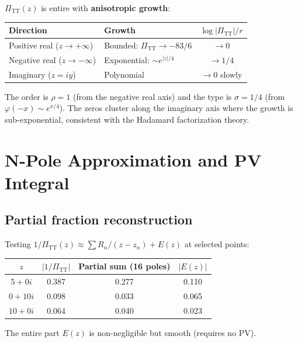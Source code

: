 \documentclass[11pt,a4paper]{article}
\newcommand{\PiTT}{\Pi_{\mathrm{TT}}}
\begin{document}
$\PiTT(z)$ is entire with \textbf{anisotropic growth}:

\begin{center}
\begin{tabular}{llc}
\toprule
Direction & Growth & $\log|\PiTT|/r$ \\
\midrule
Positive real ($z \to +\infty$) & Bounded: $\PiTT \to -83/6$ & $\to 0$ \\
Negative real ($z \to -\infty$) & Exponential: $\sim e^{|z|/4}$ &
  $\to 1/4$ \\
Imaginary ($z = iy$) & Polynomial & $\to 0$ slowly \\
\bottomrule
\end{tabular}
\end{center}

\noindent
The order is $\rho = 1$ (from the negative real axis) and the type
is $\sigma = 1/4$ (from $\varphi(-x) \sim e^{x/4}$).  The zeros
cluster along the imaginary axis where the growth is sub-exponential,
consistent with the Hadamard factorization theory.


\section{N-Pole Approximation and PV Integral}
\label{sec:npole}

\subsection{Partial fraction reconstruction}

Testing $1/\PiTT(z) \approx \sum R_n/(z - z_n) + E(z)$ at selected
points:

\begin{center}
\begin{tabular}{cccc}
\toprule
$z$ & $|1/\PiTT|$ & Partial sum (16 poles) & $|E(z)|$ \\
\midrule
$5 + 0i$ & 0.387 & 0.277 & 0.110 \\
$0 + 10i$ & 0.098 & 0.033 & 0.065 \\
$10 + 0i$ & 0.064 & 0.040 & 0.023 \\
\bottomrule
\end{tabular}
\end{center}

The entire part $E(z)$ is non-negligible but smooth (requires no PV).
\end{document}
